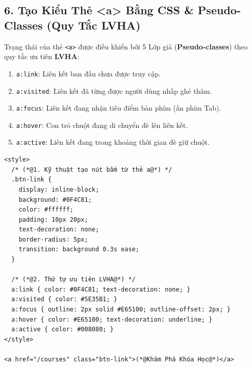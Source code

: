 \documentclass[11pt,oneside]{book}
\newcommand{\codeinline}[1]{\textcolor{accentOrange}{\texttt{#1}}}
\newcommand{\term}[1]{\textbf{\textcolor{primaryBlue}{#1}}}
\begin{document}
\subsection{6. Tạo Kiểu Thẻ <a> Bằng CSS \& Pseudo-Classes (Quy Tắc LVHA)}
Trạng thái của thẻ \codeinline{<a>} được điều khiển bởi 5 Lớp giả (\term{Pseudo-classes}) theo quy tắc ưu tiên \textbf{LVHA}:
\begin{enumerate}
    \item \codeinline{a:link}: Liên kết ban đầu chưa được truy cập.
    \item \codeinline{a:visited}: Liên kết đã từng được người dùng nhấp ghé thăm.
    \item \codeinline{a:focus}: Liên kết đang nhận tiêu điểm bàn phím (ấn phím Tab).
    \item \codeinline{a:hover}: Con trỏ chuột đang di chuyển đè lên liên kết.
    \item \codeinline{a:active}: Liên kết đang trong khoảng thời gian đè giữ chuột.
\end{enumerate}

\begin{codeWindow}
\begin{lstlisting}[language=HTML5]
<style>
  /* (*@1. Kỹ thuật tạo nút bấm từ thẻ a@*) */
  .btn-link {
    display: inline-block;
    background: #0F4C81;
    color: #ffffff;
    padding: 10px 20px;
    text-decoration: none;
    border-radius: 5px;
    transition: background 0.3s ease;
  }

  /* (*@2. Thứ tự ưu tiên LVHA@*) */
  a:link { color: #0F4C81; text-decoration: none; }
  a:visited { color: #5E35B1; }
  a:focus { outline: 2px solid #E65100; outline-offset: 2px; }
  a:hover { color: #E65100; text-decoration: underline; }
  a:active { color: #008080; }
</style>

<a href="/courses" class="btn-link">(*@Khám Phá Khóa Học@*)</a>
\end{lstlisting}
\end{codeWindow}

\begin{browserWindow}
\sffamily\small
{}
\end{browserWindow}


\end{document}

